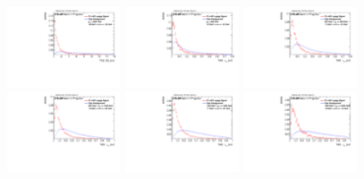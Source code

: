 \begin{figure}[H]
\includegraphics[width=0.3\textwidth]{sascha_input/Appendix/Distributions/w/distributions/beta2/h_assisted_tj_D2_2_bin6.pdf}
\bigskip 
\includegraphics[width=0.3\textwidth]{sascha_input/Appendix/Distributions/w/distributions/beta2/h_assisted_tj_nSub21_2_bin1.pdf} \hspace{1mm}
\includegraphics[width=0.3\textwidth]{sascha_input/Appendix/Distributions/w/distributions/beta2/h_assisted_tj_nSub21_2_bin2.pdf} \hspace{1mm}
\includegraphics[width=0.3\textwidth]{sascha_input/Appendix/Distributions/w/distributions/beta2/h_assisted_tj_nSub21_2_bin3.pdf} 
\bigskip
\includegraphics[width=0.3\textwidth]{sascha_input/Appendix/Distributions/w/distributions/beta2/h_assisted_tj_nSub21_2_bin4.pdf} \hspace{6mm}
\includegraphics[width=0.3\textwidth]{sascha_input/Appendix/Distributions/w/distributions/beta2/h_assisted_tj_nSub21_2_bin5.pdf} \hspace{6mm}

\end{figure}
